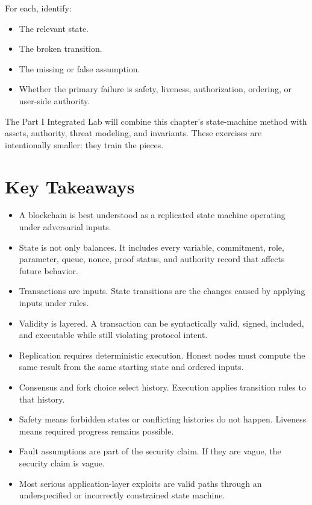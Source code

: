 For each, identify:

\begin{itemize}
\tightlist
\item
  The relevant state.
\item
  The broken transition.
\item
  The missing or false assumption.
\item
  Whether the primary failure is safety, liveness, authorization,
  ordering, or user-side authority.
\end{itemize}

The Part I Integrated Lab will combine this chapter's state-machine
method with assets, authority, threat modeling, and invariants. These
exercises are intentionally smaller: they train the pieces.

\section{Key Takeaways}

\begin{itemize}
\tightlist
\item
  A blockchain is best understood as a replicated state machine
  operating under adversarial inputs.
\item
  State is not only balances. It includes every variable, commitment,
  role, parameter, queue, nonce, proof status, and authority record that
  affects future behavior.
\item
  Transactions are inputs. State transitions are the changes caused by
  applying inputs under rules.
\item
  Validity is layered. A transaction can be syntactically valid, signed,
  included, and executable while still violating protocol intent.
\item
  Replication requires deterministic execution. Honest nodes must
  compute the same result from the same starting state and ordered
  inputs.
\item
  Consensus and fork choice select history. Execution applies transition
  rules to that history.
\item
  Safety means forbidden states or conflicting histories do not happen.
  Liveness means required progress remains possible.
\item
  Fault assumptions are part of the security claim. If they are vague,
  the security claim is vague.
\item
  Most serious application-layer exploits are valid paths through an
  underspecified or incorrectly constrained state machine.
\end{itemize}

